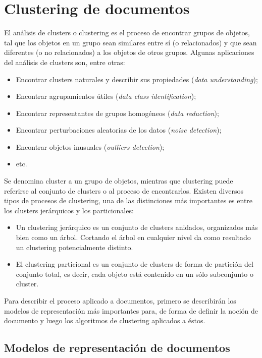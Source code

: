 \section{Clustering de documentos}
\label{sec-1.2}


   El análisis de clusters o clustering es el proceso de encontrar
   grupos de objetos, tal que los objetos en un grupo sean similares
   entre sí (o relacionados) y que sean diferentes (o no relacionados)
   a los objetos de otros grupos. Algunas aplicaciones del análisis de
   clusters son, entre otras:
\begin{itemize}
\item Encontrar clusters naturales y describir sus propiedades (\emph{data understanding});
\item Encontrar agrupamientos útiles (\emph{data class identification});
\item Encontrar representantes de grupos homogéneos (\emph{data reduction});
\item Encontrar perturbaciones aleatorias de los datos (\emph{noise detection});
\item Encontrar objetos inusuales (\emph{outliers detection});
\item etc.
\end{itemize}
   Se denomina cluster a un grupo de objetos, mientras que
   clustering puede referirse al conjunto de clusters o al proceso de
   encontrarlos. Existen diversos tipos de procesos de clustering, una
   de las distinciones más importantes es entre los clusters
   jerárquicos y los particionales:
\begin{itemize}
\item Un clustering jerárquico es un conjunto de clusters anidados,
     organizados más bien como un árbol. Cortando el árbol en
     cualquier nivel da como resultado un clustering potencialmente
     distinto.
\item El clustering particional es un conjunto de clusters de forma de
     partición del conjunto total, es decir, cada objeto está
     contenido en un sólo subconjunto o cluster.
\end{itemize}
   Para describir el proceso aplicado a documentos, primero se
   describirán los modelos de representación más importantes para,
   de forma de definir la noción de documento y luego los
   algoritmos de clustering aplicados a éstos.

\subsection{Modelos de representación de documentos}
\label{sec-1.2.1}



